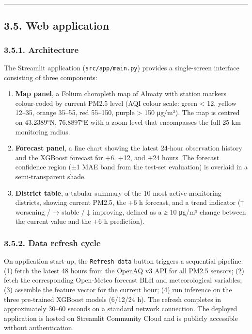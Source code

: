 \begin{center}\rule{0.5\linewidth}{0.5pt}\end{center}

\subsection{3.5. Web application}\label{web-application}

\subsubsection{3.5.1. Architecture}\label{architecture}

The Streamlit application (\texttt{src/app/main.py}) provides a single-screen interface consisting of three components:

\begin{enumerate}
\def\labelenumi{\arabic{enumi}.}
\item
  \textbf{Map panel}, a Folium choropleth map of Almaty with station markers colour-coded by current PM2.5 level (AQI colour scale: green \textless{} 12, yellow 12--35, orange 35--55, red 55--150, purple \textgreater{} 150 μg/m³). The map is centred on 43.2389°N, 76.8897°E with a zoom level that encompasses the full 25 km monitoring radius.
\item
  \textbf{Forecast panel}, a line chart showing the latest 24-hour observation history and the XGBoost forecast for +6, +12, and +24 hours. The forecast confidence region (±1 MAE band from the test-set evaluation) is overlaid in a semi-transparent shade.
\item
  \textbf{District table}, a tabular summary of the 10 most active monitoring districts, showing current PM2.5, the +6 h forecast, and a trend indicator (↑ worsening / → stable / ↓ improving, defined as a ≥ 10 μg/m³ change between the current value and the +6 h prediction).
\end{enumerate}

\subsubsection{3.5.2. Data refresh cycle}\label{data-refresh-cycle}

On application start-up, the \texttt{Refresh\ data} button triggers a sequential pipeline: (1) fetch the latest 48 hours from the OpenAQ v3 API for all PM2.5 sensors; (2) fetch the corresponding Open-Meteo forecast BLH and meteorological variables; (3) assemble the feature vector for the current hour; (4) run inference on the three pre-trained XGBoost models (6/12/24 h). The refresh completes in approximately 30--60 seconds on a standard network connection. The deployed application is hosted on Streamlit Community Cloud and is publicly accessible without authentication.

